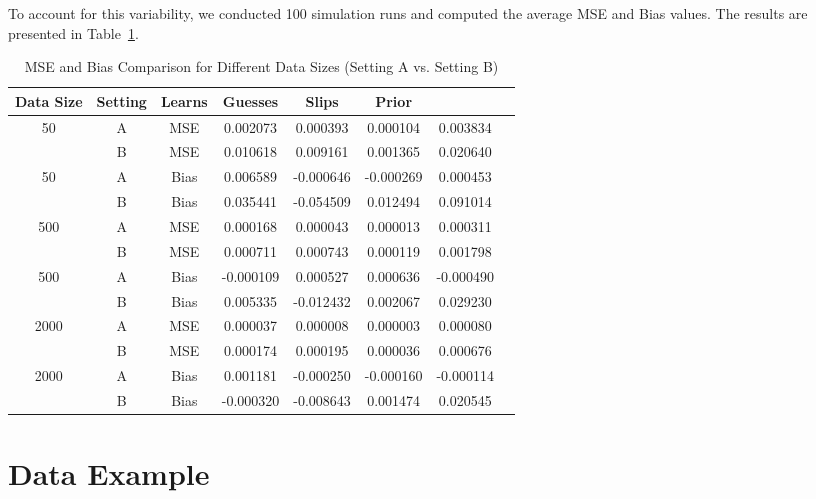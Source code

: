 \documentclass{article}
\begin{document}
To account for this variability, we conducted 100 simulation runs and computed the average MSE and Bias values. The results are presented in Table~\ref{tab:mse-bias-comparison}.
\begin{table}[H]
\centering
\caption{MSE and Bias Comparison for Different Data Sizes (Setting A vs. Setting B)}
\label{tab:mse-bias-comparison}
\begin{tabular}{|c|c|c|c|c|c|c|c|}
\hline
\textbf{Data Size} & \textbf{Setting} & \textbf{Learns} & \textbf{Guesses} & \textbf{Slips} & \textbf{Prior} \\ \hline
\multirow{2}{*}{50}  
                        & A & MSE & 0.002073 & 0.000393 & 0.000104 & 0.003834 \\ \cline{2-6}
                        & B & MSE & 0.010618 & 0.009161 & 0.001365 & 0.020640 \\ \hline
\multirow{2}{*}{50}  
                        & A & Bias & 0.006589 & -0.000646 & -0.000269 & 0.000453 \\ \cline{2-6}
                        & B & Bias  & 0.035441 & -0.054509 & 0.012494 & 0.091014 \\ \hline
\multirow{2}{*}{500}  
                        & A & MSE & 0.000168 & 0.000043 & 0.000013 & 0.000311 \\ \cline{2-6}
                        & B & MSE & 0.000711 & 0.000743 & 0.000119 & 0.001798 \\ \hline
\multirow{2}{*}{500}  
                        & A & Bias  & -0.000109 & 0.000527 & 0.000636 & -0.000490 \\ \cline{2-6}
                        & B & Bias  & 0.005335 & -0.012432 & 0.002067 & 0.029230 \\ \hline
\multirow{2}{*}{2000}  
                        & A & MSE & 0.000037 & 0.000008 & 0.000003 & 0.000080 \\ \cline{2-6}
                        & B & MSE & 0.000174 & 0.000195 & 0.000036 & 0.000676 \\ \hline
\multirow{2}{*}{2000}  
                        & A & Bias  & 0.001181 & -0.000250 & -0.000160 & -0.000114 \\ \cline{2-6}
                        & B & Bias  & -0.000320 & -0.008643 & 0.001474 & 0.020545 \\ \hline
\end{tabular}
\end{table}
    

\section{Data Example}
\end{document}
